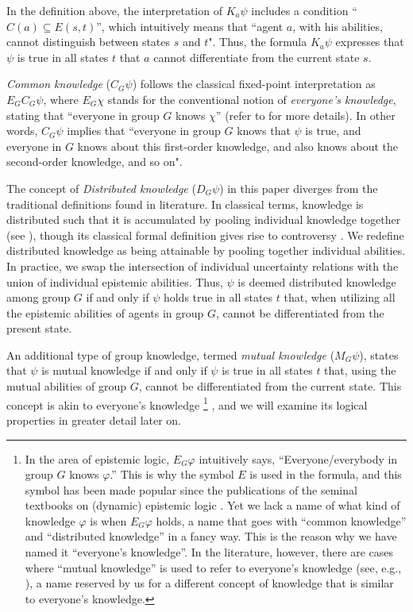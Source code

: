 \documentclass{article}
\renewcommand{\phi}{\varphi}
\begin{document}
In the definition above, the interpretation of $K_a \psi$ includes a condition ``$C(a) \subseteq E(s,t)$'', which intuitively means that ``agent $a$, with his abilities, cannot distinguish between states $s$ and $t$". Thus, the formula $K_a \psi$ expresses that $\psi$ is true in all states $t$ that $a$ cannot differentiate from the current state $s$.

\emph{Common knowledge} ($C_G\psi$) follows the classical fixed-point interpretation as $E_G C_G \psi$, where $E_G \chi$ stands for the conventional notion of \emph{everyone's knowledge}, stating that ``everyone in group $G$ knows $\chi$'' (refer to \cite{HM1992} for more details). In other words, $C_G\psi$ implies that ``everyone in group $G$ knows that $\psi$ is true, and everyone in $G$ knows about this first-order knowledge, and also knows about the second-order knowledge, and so on".

The concept of \emph{Distributed knowledge} ($D_G\psi$) in this paper diverges from the traditional definitions found in literature. In classical terms, knowledge is distributed such that it is accumulated by pooling individual knowledge together (see \cite[Chapter 1]{HM1992}), though its classical formal definition gives rise to controversy \cite{Roelofsen2007,AW2017rdk}. We redefine distributed knowledge as being attainable by pooling together individual abilities. In practice, we swap the intersection of individual uncertainty relations with the union of individual epistemic abilities. Thus, $\psi$ is deemed distributed knowledge among group $G$ if and only if $\psi$ holds true in all states $t$ that, when utilizing all the epistemic abilities of agents in group $G$, cannot be differentiated from the present state.

An additional type of group knowledge, termed \emph{mutual knowledge} ($M_G\psi$), states that $\psi$ is mutual knowledge if and only if $\psi$ is true in all states $t$ that, using the mutual abilities of group $G$, cannot be differentiated from the current state. This concept is akin to everyone's knowledge%
\footnote{In the area of epistemic logic, $E_G \phi$ intuitively says, ``Everyone/everybody in group $G$ knows $\phi$.'' This is why the symbol $E$ is used in the formula, and this symbol has been made popular since the publications of the seminal textbooks on (dynamic) epistemic logic \cite{FHMV1995,MvdH1995,vDvdHK2008} . Yet we lack a name of what kind of knowledge $\phi$ is when $E_G\phi$ holds, a name that goes with ``common knowledge'' and ``distributed knowledge'' in a fancy way. This is the reason why we have named it ``everyone's knowledge''. In the literature, however, there are cases where ``mutual knowledge'' is used to refer to everyone's knowledge (see, e.g., \cite{VS2022}), a name reserved by us for a different concept of knowledge that is similar to everyone's knowledge.}%
, and we will examine its logical properties in greater detail later on.
\end{document}
